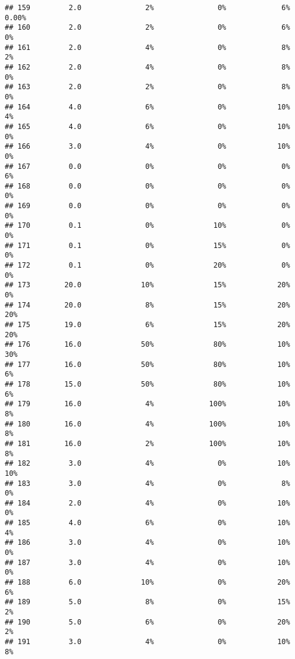 \documentclass[
]{article}
\begin{document}
\begin{verbatim}
## 159         2.0               2%               0%             6%       0.00%
## 160         2.0               2%               0%             6%          0%
## 161         2.0               4%               0%             8%          2%
## 162         2.0               4%               0%             8%          0%
## 163         2.0               2%               0%             8%          0%
## 164         4.0               6%               0%            10%          4%
## 165         4.0               6%               0%            10%          0%
## 166         3.0               4%               0%            10%          0%
## 167         0.0               0%               0%             0%          6%
## 168         0.0               0%               0%             0%          0%
## 169         0.0               0%               0%             0%          0%
## 170         0.1               0%              10%             0%          0%
## 171         0.1               0%              15%             0%          0%
## 172         0.1               0%              20%             0%          0%
## 173        20.0              10%              15%            20%          0%
## 174        20.0               8%              15%            20%         20%
## 175        19.0               6%              15%            20%         20%
## 176        16.0              50%              80%            10%         30%
## 177        16.0              50%              80%            10%          6%
## 178        15.0              50%              80%            10%          6%
## 179        16.0               4%             100%            10%          8%
## 180        16.0               4%             100%            10%          8%
## 181        16.0               2%             100%            10%          8%
## 182         3.0               4%               0%            10%         10%
## 183         3.0               4%               0%             8%          0%
## 184         2.0               4%               0%            10%          0%
## 185         4.0               6%               0%            10%          4%
## 186         3.0               4%               0%            10%          0%
## 187         3.0               4%               0%            10%          0%
## 188         6.0              10%               0%            20%          6%
## 189         5.0               8%               0%            15%          2%
## 190         5.0               6%               0%            20%          2%
## 191         3.0               4%               0%            10%          8%

\end{verbatim}
\end{document}
